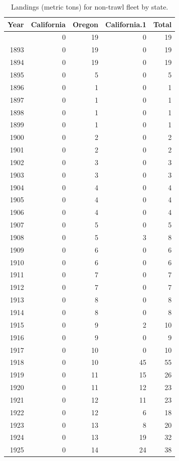 \documentclass[
]{scrartcl}
\begin{document}
\begin{longtable}{rrrrr}

\caption{\label{tbl-NT_landings}Landings (metric tons) for non-trawl
fleet by state.}

\tabularnewline

\toprule
Year & California & Oregon & California.1 & Total \\ 
\midrule\addlinespace[2.5pt]
1892 & 0 & 19 & 0 & 19 \\ 
1893 & 0 & 19 & 0 & 19 \\ 
1894 & 0 & 19 & 0 & 19 \\ 
1895 & 0 & 5 & 0 & 5 \\ 
1896 & 0 & 1 & 0 & 1 \\ 
1897 & 0 & 1 & 0 & 1 \\ 
1898 & 0 & 1 & 0 & 1 \\ 
1899 & 0 & 1 & 0 & 1 \\ 
1900 & 0 & 2 & 0 & 2 \\ 
1901 & 0 & 2 & 0 & 2 \\ 
1902 & 0 & 3 & 0 & 3 \\ 
1903 & 0 & 3 & 0 & 3 \\ 
1904 & 0 & 4 & 0 & 4 \\ 
1905 & 0 & 4 & 0 & 4 \\ 
1906 & 0 & 4 & 0 & 4 \\ 
1907 & 0 & 5 & 0 & 5 \\ 
1908 & 0 & 5 & 3 & 8 \\ 
1909 & 0 & 6 & 0 & 6 \\ 
1910 & 0 & 6 & 0 & 6 \\ 
1911 & 0 & 7 & 0 & 7 \\ 
1912 & 0 & 7 & 0 & 7 \\ 
1913 & 0 & 8 & 0 & 8 \\ 
1914 & 0 & 8 & 0 & 8 \\ 
1915 & 0 & 9 & 2 & 10 \\ 
1916 & 0 & 9 & 0 & 9 \\ 
1917 & 0 & 10 & 0 & 10 \\ 
1918 & 0 & 10 & 45 & 55 \\ 
1919 & 0 & 11 & 15 & 26 \\ 
1920 & 0 & 11 & 12 & 23 \\ 
1921 & 0 & 12 & 11 & 23 \\ 
1922 & 0 & 12 & 6 & 18 \\ 
1923 & 0 & 13 & 8 & 20 \\ 
1924 & 0 & 13 & 19 & 32 \\ 
1925 & 0 & 14 & 24 & 38 \\ 

\end{longtable}
\end{document}
